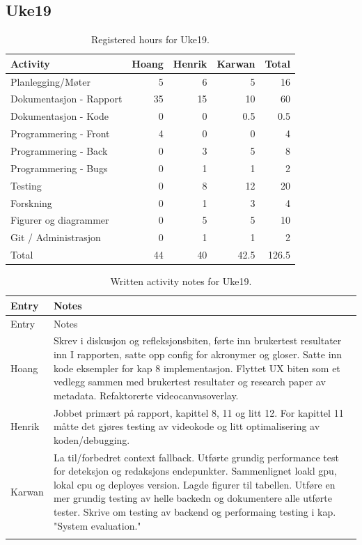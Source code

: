 \subsection{Uke19}

\begin{table}[H]
\centering
\small
\caption{Registered hours for Uke19.}
\label{tab:project-hours-uke19}
\begin{tabular}{lrrrr}
\toprule
Activity & Hoang & Henrik & Karwan & Total \\
\midrule
Planlegging/Møter & 5 & 6 & 5 & 16 \\
Dokumentasjon - Rapport & 35 & 15 & 10 & 60 \\
Dokumentasjon - Kode & 0 & 0 & 0.5 & 0.5 \\
Programmering - Front & 4 & 0 & 0 & 4 \\
Programmering - Back & 0 & 3 & 5 & 8 \\
Programmering - Bugs & 0 & 1 & 1 & 2 \\
Testing & 0 & 8 & 12 & 20 \\
Forskning & 0 & 1 & 3 & 4 \\
Figurer og diagrammer & 0 & 5 & 5 & 10 \\
Git / Administrasjon & 0 & 1 & 1 & 2 \\
\midrule
Total & 44 & 40 & 42.5 & 126.5 \\
\bottomrule
\end{tabular}
\end{table}

\begin{longtable}{p{}p{}}
\caption{Written activity notes for Uke19.}\\
\toprule
Entry & Notes \\
\midrule
\endfirsthead
\toprule
Entry & Notes \\
\midrule
\endhead
Hoang & Skrev i diskusjon og refleksjonsbiten, førte inn brukertest resultater inn I rapporten, satte opp config for akronymer og gloser. Satte inn kode eksempler for kap 8 implementasjon. Flyttet UX biten som et vedlegg sammen med brukertest resultater og research paper av metadata. Refaktorerte videocanvasoverlay. \\
\addlinespace
Henrik & Jobbet primært på rapport, kapittel 8, 11 og litt 12. For kapittel 11 måtte det gjøres testing av videokode og litt optimalisering av koden/debugging. \\
\addlinespace
Karwan & La til/forbedret context fallback. Utførte grundig performance test for deteksjon og redaksjons endepunkter. Sammenlignet loakl gpu, lokal cpu og deployes version. Lagde figurer til tabellen. Utføre en mer grundig testing av helle backedn og dokumentere alle utførte tester. Skrive om testing av backend og performaing testing i kap. "System evaluation." \\
\addlinespace
\bottomrule
\end{longtable}

